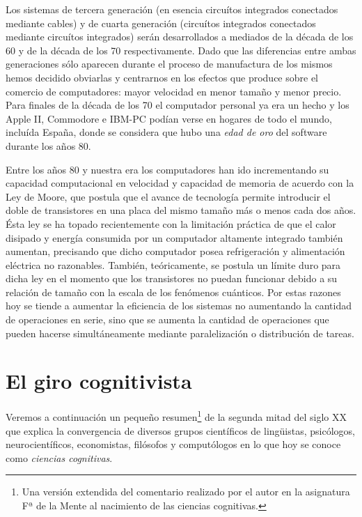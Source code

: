 \documentclass[12pt]{memoir}
\begin{document}
\begin{appendices}
Los sistemas de tercera generación (en esencia circuítos integrados conectados mediante cables) y de cuarta generación (circuítos integrados conectados mediante circuítos integrados) serán desarrollados a mediados de la década de los 60 y de la década de los 70 respectivamente. Dado que las diferencias entre ambas generaciones sólo aparecen durante el proceso de manufactura de los mismos hemos decidido obviarlas y centrarnos en los efectos que produce sobre el comercio de computadores: mayor velocidad en menor tamaño y menor precio. Para finales de la década de los 70 el computador personal ya era un hecho y los Apple II, Commodore e IBM-PC podían verse en hogares de todo el mundo, incluída España, donde se considera que hubo una \textit{edad de oro} del software durante los años 80.

Entre los años 80 y nuestra era los computadores han ido incrementando su capacidad computacional en velocidad y capacidad de memoria de acuerdo con la Ley de Moore, que postula que el avance de tecnología permite introducir el doble de transistores en una placa del mismo tamaño más o menos cada dos años. Ésta ley se ha topado recientemente con la limitación práctica de que el calor disipado y energía consumida por un computador altamente integrado también aumentan, precisando que dicho computador posea refrigeración y alimentación eléctrica no razonables. También, teóricamente, se postula un límite duro para dicha ley en el momento que los transistores no puedan funcionar debido a su relación de tamaño con la escala de los fenómenos cuánticos. Por estas razones hoy se tiende a aumentar la eficiencia de los sistemas no aumentando la cantidad de operaciones en serie, sino que se aumenta la cantidad de operaciones que pueden hacerse simultáneamente mediante paralelización o distribución de tareas.

\chapter{El giro cognitivista}
\label{cognitiveHistory}

Veremos a continuación un pequeño resumen\footnote{Una versión extendida del comentario realizado por el autor en la asignatura Fª de la Mente al nacimiento de las ciencias cognitivas.} de la segunda mitad del siglo XX que explica la convergencia de diversos grupos científicos de lingüistas, psicólogos, neurocientíficos, economistas, filósofos y computólogos en lo que hoy se conoce como \textit{ciencias cognitivas}.


\end{appendices}
\end{document}
